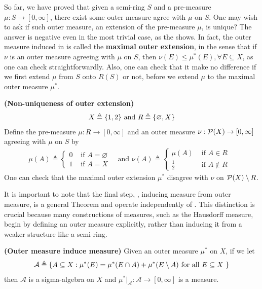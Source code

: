\documentclass{report}
\begin{document}
\begin{mdframed}
  So far, we have proved that given a semi-ring $S$ and a pre-measure $\mu:S\rightarrow [0,\infty]$, there exist some outer measure agree with $\mu$ on $S$. One may wish to ask if such outer measure, an extension of the pre-measure $\mu$, is unique? The answer is negative even in the most trivial case, as the  shows. In fact, the outer measure induced in  is called the \textbf{maximal outer extension}, in the sense that if $\nu$ is an outer measure agreeing with  $\mu$ on $S$, then  $\nu(E)\leq \mu^*(E),\forall E\subseteq X$, as one can check straightforwardly. Also, one can check that it make no difference if we first extend $\mu$ from $S$ onto  $R(S)$ or not, before we extend $\mu$ to the maximal outer measure $\mu^*$. 
\end{mdframed}
\begin{Example}{\textbf{(Non-uniqueness of outer extension)}}{}
\label{Nou}
\begin{align*}
X\triangleq \{ 1,2 \}\text{ and }R\triangleq \{ \varnothing,X \}
\end{align*}
Define the pre-measure $\mu:R\rightarrow [0,\infty]$ and an outer measure $\nu:\mathcal{P}(X)\rightarrow [0,\infty]$ agreeing with $\mu$ on $S$ by 
\begin{align*}
\mu (A)\triangleq \begin{cases}
  0& \text{ if $A=\varnothing$ }\\
  1& \text{ if $A=X$ }
\end{cases}\text{ and }\nu(A)\triangleq \begin{cases}
  \mu (A)& \text{ if $A\in R$ }\\
  \frac{1}{2}& \text{ if $A\not\in R$ }
\end{cases}
\end{align*}
One can check that the maximal outer extension $\mu^*$ disagree with $\nu$ on $\mathcal{P}(X)\setminus R$.
\end{Example}
\begin{mdframed}
It is important to note that the final step, , inducing measure from outer measure, is a general Theorem and operate independently of . This distinction is crucial because many constructions of measures, such as the Hausdorff measure, begin by defining an outer measure explicitly, rather than inducing it from a weaker structure like a semi-ring.
\end{mdframed}
\begin{theorem}
\label{Omi}
\textbf{(Outer measure induce measure)} Given an outer measure $\mu^*$ on $X$, if we let 
\begin{align*}
  \mathcal{A}\triangleq \{ A \subseteq X:\mu^*(E)=\mu^*(E\cap A)+ \mu^*(E\setminus A)\text{ for all $E\subseteq X$ } \} 
\end{align*}
then $\mathcal{A}$ is a sigma-algebra on $X$ and  $\mu^*|_{\mathcal{A}}:\mathcal{A}\rightarrow [0,\infty]$ is a measure. 
\end{theorem}
\end{document}
